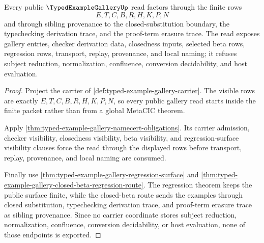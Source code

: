 \begin{theorem}
\label{thm:typedexamplegallery-obligation-surface}
Every public $\TypedExampleGalleryUp$ read factors through the finite rows
$$
E,T,C,B,R,H,K,P,N
$$
and through sibling provenance to the closed-substitution boundary, the typechecking derivation trace, and the proof-term erasure trace. The read exposes gallery entries, checker derivation data, closedness inputs, selected beta rows, regression rows, transport, replay, provenance, and local naming; it refuses subject reduction, normalization, confluence, conversion decidability, and host evaluation.
\end{theorem}
\begin{proof}
Project the carrier of \autoref{def:typed-example-gallery-carrier}. The visible rows are exactly $E,T,C,B,R,H,K,P,N$, so every public gallery read starts inside the finite packet rather than from a global MetaCIC theorem.

Apply \autoref{thm:typed-example-gallery-namecert-obligations}. Its carrier admission, checker visibility, closedness visibility, beta visibility, and regression-surface visibility clauses force the read through the displayed rows before transport, replay, provenance, and local naming are consumed.

Finally use \autoref{thm:typed-example-gallery-regression-surface} and \autoref{thm:typed-example-gallery-closed-beta-regression-route}. The regression theorem keeps the public surface finite, while the closed-beta route sends the examples through closed substitution, typechecking derivation trace, and proof-term erasure trace as sibling provenance. Since no carrier coordinate stores subject reduction, normalization, confluence, conversion decidability, or host evaluation, none of those endpoints is exported.
\end{proof}

